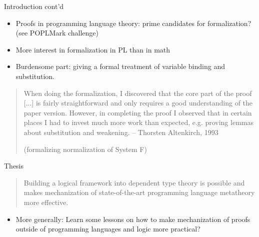 \documentclass[usenames,dvipsnames]{beamer}
\begin{document}
\begin{frame}{Introduction cont'd}
\begin{itemize}
\item Proofs in programming language theory: prime
candidates for formalization? (see POPLMark challenge)
\item More interest in formalization in PL than in math
\pause
\item Burdensome part: giving a formal treatment of variable binding and
substitution.
\end{itemize}
\pause
\begin{quote}
When doing the formalization, I discovered that the core part of the
proof [...] is fairly straightforward and
only requires a good understanding of the paper version. However, in
completing the proof I observed that in certain places I had to invest
much more work than expected, e.g. proving lemmas about substitution
and weakening. -- Thorsten Altenkirch, 1993

   (formalizing normalization of System F)
\end{quote}
\end{frame}

\begin{frame}{Thesis}
\begin{quote}Building a logical framework into dependent type
theory is possible and makes mechanization of state-of-the-art programming
language metatheory more effective.
\end{quote}
\begin{itemize}
\pause
\item More generally: Learn some lessons on how
to make mechanization of proofs outside of programming languages and
logic more practical?
\end{itemize}
\end{frame}
\end{document}
